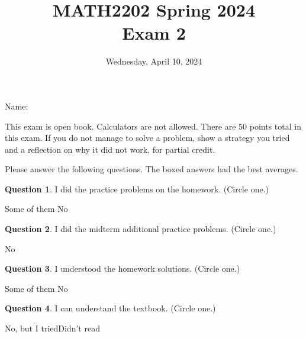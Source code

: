 \documentclass[11pt,oneside]{amsart}
\title{MATH2202 Spring 2024\\
Exam 2}
\author{Wednesday, April 10, 2024}
\theoremstyle{definition}
\newtheorem{question}{Question}
\theoremstyle{plain}
\begin{document}
\maketitle

Name: \underline{\hspace{6cm}}

This exam is open book. Calculators are not allowed. There are 50 points total in this exam. If you do not manage to solve a problem, show a strategy you tried and a reflection on why it did not work, for partial credit.

\vskip 2cm

Please answer the following questions. {\color{blue} The boxed answers had the best averages.}

\begin{question}
  I did the practice problems on the homework. (Circle one.)

  \hspace{1.5cm}\hspace{1.5cm} Some of them\hspace{1.5cm} No
\end{question}

\begin{question}
  I did the midterm additional practice problems. (Circle one.)

  \hspace{1.5cm}\hspace{1.5cm} \hspace{1.5cm} No\hspace{1.5cm}
\end{question}

\begin{question}
  I understood the homework solutions. (Circle one.)

  \hspace{1.5cm}\hspace{1.5cm} Some of them\hspace{1.5cm} No
\end{question}

\begin{question}
  I can understand the textbook. (Circle one.)

  \hspace{1.5cm}\hspace{1.5cm} \hspace{1.5cm} No, but I tried\hspace{1.5cm}Didn't read
\end{question}
\end{document}
